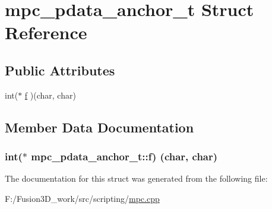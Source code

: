 \hypertarget{structmpc__pdata__anchor__t}{}\section{mpc\+\_\+pdata\+\_\+anchor\+\_\+t Struct Reference}
\label{structmpc__pdata__anchor__t}
\subsection*{Public Attributes}
\begin{DoxyCompactItemize}
\item 
int($\ast$ \hyperlink{structmpc__pdata__anchor__t_a9a5b66af011cbe9494d926f1230f6274}{f} )(char, char)
\end{DoxyCompactItemize}


\subsection{Member Data Documentation}
\hypertarget{structmpc__pdata__anchor__t_a9a5b66af011cbe9494d926f1230f6274}{}
\subsubsection[{f}]{\setlength{\rightskip}{0pt plus 5cm}int($\ast$ mpc\+\_\+pdata\+\_\+anchor\+\_\+t\+::f) (char, char)}\label{structmpc__pdata__anchor__t_a9a5b66af011cbe9494d926f1230f6274}


The documentation for this struct was generated from the following file\+:\begin{DoxyCompactItemize}
\item 
F\+:/\+Fusion3\+D\+\_\+work/src/scripting/\hyperlink{mpc_8cpp}{mpc.\+cpp}\end{DoxyCompactItemize}
